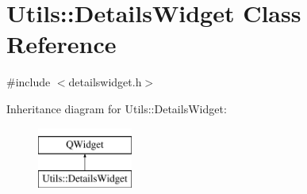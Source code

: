 \hypertarget{class_utils_1_1_details_widget}{\section{Utils\-:\-:Details\-Widget Class Reference}
\label{class_utils_1_1_details_widget}
}


{\ttfamily \#include $<$detailswidget.\-h$>$}

Inheritance diagram for Utils\-:\-:Details\-Widget\-:\begin{figure}[H]
\begin{center}
\leavevmode
\includegraphics[height=2.000000cm]{class_utils_1_1_details_widget}
\end{center}
\end{figure}
